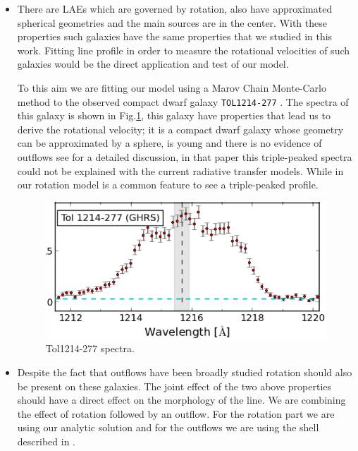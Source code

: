 \begin{itemize}


\item There are LAEs which are governed by rotation, also 
have approximated spherical geometries and the main \ly sources are in the center. 
With these properties such galaxies have the same properties 
that we studied in this work.  
Fitting \ly line profile in order  to measure the rotational 
velocities of such galaxies would be the direct application 
and test of our model. 

To this aim we are fitting our model using a Marov Chain Monte-Carlo 
method to the observed compact dwarf galaxy \verb+TOL1214-277+\citep{Thuan97, Verhamme15}
. The spectra of this galaxy is shown in Fig.\ref{fig:tol}, 
this galaxy have properties that lead us to derive the rotational 
velocity; it is a compact dwarf galaxy whose geometry can be approximated by a sphere, 
is young and there is no evidence of outflows see \citep{Verhamme15} for a detailed
discussion, in that paper this triple-peaked spectra could not be explained
with the current radiative transfer models. While in our rotation 
model is a common feature to see a triple-peaked profile. 

\begin{figure} 
\begin{center}
\includegraphics[scale=0.6]{Figures/tol.png}
\end{center}\caption{Tol1214-277 spectra.\label{fig:tol}} 
\end{figure}

\item Despite the fact that outflows have been broadly studied rotation should 
also be present on these galaxies. The joint effect of the two above properties 
should have a direct effect on the morphology of the \lya line. We are 
 combining the effect of rotation followed by an outflow. For the rotation
part we are using our analytic solution and for the outflows
we are using the shell described in \citep{Verhamme12}. 
\end{itemize}
